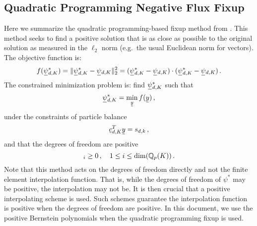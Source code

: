 \documentclass[../doc.tex]{subfiles}
\begin{document}
\subsection{Quadratic Programming Negative Flux Fixup} \label{sn_sec:qp}
Here we summarize the quadratic programming-based fixup method from \textcite{YEE2020109696}. This method seeks to find a positive solution that is as close as possible to the original solution as measured in the $\ell_2$ norm (e.g.~the usual Euclidean norm for vectors). The objective function is:
	\begin{equation}
		f(\ubar{\psi}_{d,K}^*) = \| \ubar{\psi}_{d,K}^* - \ubar{\psi}_{d,K} \|_2^2 = (\ubar{\psi}_{d,K}^* - \ubar{\psi}_{d,K}) \cdot (\ubar{\psi}_{d,K}^* - \ubar{\psi}_{d,K}) \,. 
	\end{equation}
The constrained minimization problem is: find $\ubar{\psi}_{d,K}^*$ such that 
	\begin{equation}
		\ubar{\psi}_{d,K}^* = \min_{\ubar{y}} f(\ubar{y}) \,, 
	\end{equation}
under the constraints of particle balance 
	\begin{equation}
		\ubar{c}_{d,K}^T \ubar{y} = s_{d,k} \,,
	\end{equation}
and that the degrees of freedom are positive
	\begin{equation}
		[\ubar{y}]_i \geq 0 \,, \quad 1 \leq i \leq \dim(\Qbb{p}(K)) \,. 
	\end{equation}
Note that this method acts on the degrees of freedom directly and not the finite element interpolation function. That is, while the degrees of freedom of $\psi^*$ may be positive, the interpolation may not be. It is then crucial that a positive interpolating scheme is used. Such schemes guarantee the interpolation function is positive when the degrees of freedom are positive. In this document, we use the positive Bernstein polynomials \cite{doi:10.1137/11082539X} when the quadratic programming fixup is used. 
\end{document}
